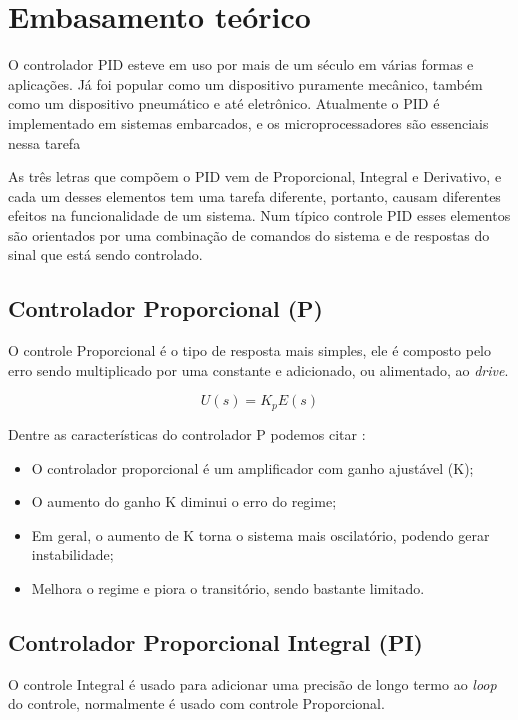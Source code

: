 \documentclass[
	12pt,				%
	openany,			%
	oneside,			%
	a4paper,			%
	english,			%
	french,				%
	spanish,			%
	brazil,				%
	]{abntex2}
\begin{document}
{\chapter{Embasamento teórico}

O controlador PID esteve em uso por mais de um século em várias formas e aplicações. Já foi popular como um dispositivo puramente mecânico, também como um dispositivo pneumático e até eletrônico. Atualmente o PID é implementado em sistemas embarcados, e os microprocessadores são essenciais nessa tarefa \cite{timwescott1}

As três letras que compõem o PID vem de Proporcional, Integral e Derivativo, e cada um desses elementos tem uma tarefa diferente, portanto, causam diferentes efeitos na funcionalidade de um sistema. Num típico controle PID esses elementos são orientados por uma combinação de comandos do sistema e de respostas do sinal que está sendo controlado.


\section{Controlador Proporcional (P)}

O controle Proporcional é o tipo de resposta mais simples, ele é composto pelo erro sendo multiplicado por uma constante e adicionado, ou alimentado, ao \textit{drive}.

\begin{equation}
U(s) = K_pE(s)
\end{equation}

Dentre as características do controlador P podemos citar \cite{meneghetti1}:

\begin{itemize}
    \item O controlador proporcional é um amplificador com ganho ajustável (K);
    \item O aumento do ganho K diminui o erro do regime;
    \item Em geral, o aumento de K torna o sistema mais oscilatório, podendo gerar instabilidade;
    \item Melhora o regime e piora o transitório, sendo bastante limitado.
\end{itemize}


\section{Controlador Proporcional Integral (PI)}

O controle Integral é usado para adicionar uma precisão de longo termo ao \textit{loop} do controle, normalmente é usado com controle Proporcional. 

}
\end{document}
